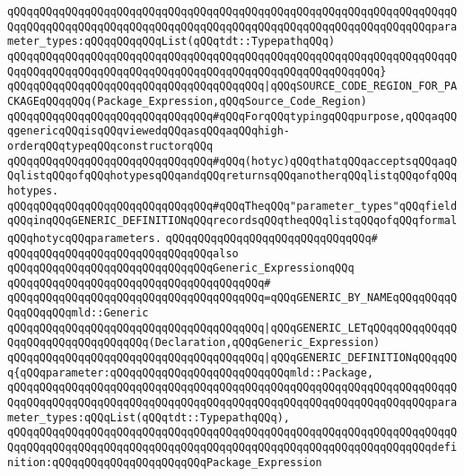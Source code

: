 \verb|qQQqqQQqqQQqqQQqqQQqqQQqqQQqqQQqqQQqqQQqqQQqqQQqqQQqqQQqqQQqqQQqqQQqqQQqqQQqqQQqqQQqqQQqqQQqqQQqqQQqqQQqqQQqqQQqqQQqqQQqqQQqqQQqqQQqqQQqparameter_types:qQQqqQQqqQQqList(qQQqtdt::TypepathqQQq)|\newline
\verb|qQQqqQQqqQQqqQQqqQQqqQQqqQQqqQQqqQQqqQQqqQQqqQQqqQQqqQQqqQQqqQQqqQQqqQQqqQQqqQQqqQQqqQQqqQQqqQQqqQQqqQQqqQQqqQQqqQQqqQQqqQQqqQQq}|\newline
\verb|qQQqqQQqqQQqqQQqqQQqqQQqqQQqqQQqqQQqqQQq|\verb#|qQQqSOURCE_CODE_REGION_FOR_PACKAGEqQQqqQQq(Package_Expression,qQQqSource_Code_Region)#\newline
\newline
\newline
\newline
\verb|qQQqqQQqqQQqqQQqqQQqqQQqqQQqqQQq#qQQqForqQQqtypingqQQqpurpose,qQQqaqQQqgenericqQQqisqQQqviewedqQQqasqQQqaqQQqhigh-orderqQQqtypeqQQqconstructorqQQq|\newline
\verb|qQQqqQQqqQQqqQQqqQQqqQQqqQQqqQQq#qQQq(hotyc)qQQqthatqQQqacceptsqQQqaqQQqlistqQQqofqQQqhotypesqQQqandqQQqreturnsqQQqanotherqQQqlistqQQqofqQQqhotypes.|\newline
\verb|qQQqqQQqqQQqqQQqqQQqqQQqqQQqqQQq#qQQqTheqQQq"parameter_types"qQQqfieldqQQqinqQQqGENERIC_DEFINITIONqQQqrecordsqQQqtheqQQqlistqQQqofqQQqformalqQQqhotycqQQqparameters.|\newline
\verb|qQQqqQQqqQQqqQQqqQQqqQQqqQQqqQQq#|\newline
\verb|qQQqqQQqqQQqqQQqqQQqqQQqqQQqqQQqalso|\newline
\verb|qQQqqQQqqQQqqQQqqQQqqQQqqQQqqQQqGeneric_ExpressionqQQq|\newline
\verb|qQQqqQQqqQQqqQQqqQQqqQQqqQQqqQQqqQQqqQQq#|\newline
\verb|qQQqqQQqqQQqqQQqqQQqqQQqqQQqqQQqqQQqqQQq=qQQqGENERIC_BY_NAMEqQQqqQQqqQQqqQQqqQQqmld::Generic|\newline
\verb|qQQqqQQqqQQqqQQqqQQqqQQqqQQqqQQqqQQqqQQq|\verb#|qQQqGENERIC_LETqQQqqQQqqQQqqQQqqQQqqQQqqQQqqQQqqQQq(Declaration,qQQqGeneric_Expression)#\newline
\verb|qQQqqQQqqQQqqQQqqQQqqQQqqQQqqQQqqQQqqQQq|\verb#|qQQqGENERIC_DEFINITIONqQQqqQQq{qQQqparameter:qQQqqQQqqQQqqQQqqQQqqQQqqQQqmld::Package,#\newline
\verb|qQQqqQQqqQQqqQQqqQQqqQQqqQQqqQQqqQQqqQQqqQQqqQQqqQQqqQQqqQQqqQQqqQQqqQQqqQQqqQQqqQQqqQQqqQQqqQQqqQQqqQQqqQQqqQQqqQQqqQQqqQQqqQQqqQQqqQQqparameter_types:qQQqList(qQQqtdt::TypepathqQQq),|\newline
\verb|qQQqqQQqqQQqqQQqqQQqqQQqqQQqqQQqqQQqqQQqqQQqqQQqqQQqqQQqqQQqqQQqqQQqqQQqqQQqqQQqqQQqqQQqqQQqqQQqqQQqqQQqqQQqqQQqqQQqqQQqqQQqqQQqqQQqqQQqdefinition:qQQqqQQqqQQqqQQqqQQqqQQqPackage_Expression|\newline

